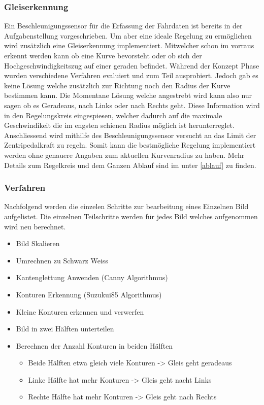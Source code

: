 \documentclass[../../main.tex]{subfiles}
\begin{document}
\subsubsection{Gleiserkennung}
Ein Beschleunigungssensor für die Erfassung der Fahrdaten ist bereits in der Aufgabenstellung vorgeschrieben.
Um aber eine ideale Regelung zu ermöglichen wird zusätzlich eine Gleiserkennung implementiert. Mitwelcher schon im vorraus
erkennt werden kann ob eine Kurve bevorsteht oder ob sich der Hochgeschwindigkeitszug auf einer geraden befindet.
Während der Konzept Phase wurden verschiedene Verfahren evaluiert und zum Teil ausprobiert. Jedoch gab es keine Lösung welche zusätzlich zur Richtung noch den Radius
der Kurve bestimmen kann. Die Momentane Lösung welche angestrebt wird kann also nur sagen ob es Geradeaus, nach Links oder nach Rechts geht.
Diese Information wird in den Regelungskreis eingespiesen, welcher dadurch auf die maximale Geschwindikeit die im engsten schienen Radius möglich ist
herunterreglet. Anschliessend wird mithilfe des Beschleunigungssensor versucht an das Limit der Zentripedalkraft zu regeln. Somit kann die
bestmögliche Regelung implementiert werden ohne genauere Angaben zum aktuellen Kurvenradius zu haben.
Mehr Details zum Regelkreis und dem Ganzen Ablauf sind im unter \ref{ablauf} zu finden.

\subsubsection{Verfahren}
Nachfolgend werden die einzelen Schritte zur bearbeitung eines Einzelnen Bild aufgelistet.
Die einzelnen Teilschritte werden für jedes Bild welches aufgenommen wird neu berechnet.
\begin{itemize} %
    \item Bild Skalieren
    \item Umrechnen zu Schwarz Weiss
    \item Kantenglettung Anwenden (Canny Algorithmus)
    \item Konturen Erkennung (Suzukui85 Algorithmus)
    \item Kleine Konturen erkennen und verwerfen
    \item Bild in zwei Hälften unterteilen
    \item Berechnen der Anzahl Konturen in beiden Hälften
        \begin{itemize}
            \item Beide Hälften etwa gleich viele Konturen -> Gleis geht geradeaus
            \item Linke Hälfte hat mehr Konturen -> Gleis geht nacht Links
            \item Rechte Hälfte hat mehr Konturen -> Gleis geht nach Rechts
        \end{itemize}
\end{itemize}
\end{document}
